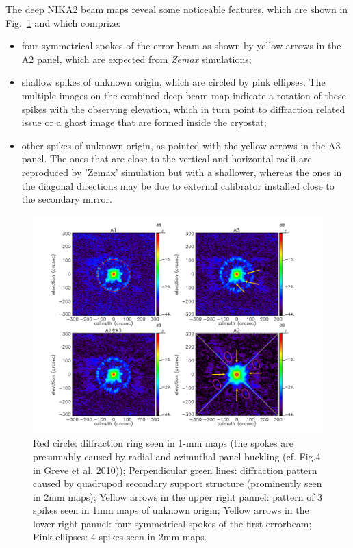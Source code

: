 The deep NIKA2 beam maps reveal some noticeable features, which are
shown in Fig.~\ref{fig:features} and which comprize:
\begin{itemize}
\item[(1)] four symmetrical spokes of the error beam as shown by
  yellow arrows in the A2 panel, which are expected from \emph{Zemax}
  simulations;
\item[(2)] shallow spikes of unknown origin, which are circled by pink
  ellipses. The multiple images on the combined deep beam map indicate
  a rotation of these spikes with the observing elevation, which in
  turn point to diffraction related issue or a ghost image that are
  formed inside the cryostat;
\item[(3)] other spikes of unknown origin, as pointed with the yellow
  arrows in the A3 panel. The ones that are close to the vertical and
  horizontal radii are reproduced by 'Zemax' simulation but with a  
  shallower, whereas the ones in the diagonal directions may be due to
  external calibrator installed close to the secondary mirror.  
\end{itemize}

\begin{figure}[ht!]
\begin{center}
  \includegraphics[clip, angle=0, scale=0.4]{Figures/Beams_features.pdf}
\caption[Noticeable features of NIKA2 beam pattern.]{ Red circle: diffraction ring seen in 1-mm maps (the spokes are presumably caused by radial and azimuthal panel buckling (cf. Fig.4 in Greve et al. 2010)); Perpendicular green lines: diffraction pattern caused by quadrupod secondary support structure (prominently seen in 2mm maps); Yellow arrows in the upper right pannel: pattern of 3 spikes seen in 1mm maps of unknown origin; Yellow arrows in the lower right pannel: four symmetrical spokes of the first errorbeam; Pink ellipses: 4 spikes seen in 2mm maps.}
\label{fig:features}
\end{center}
\end{figure}


